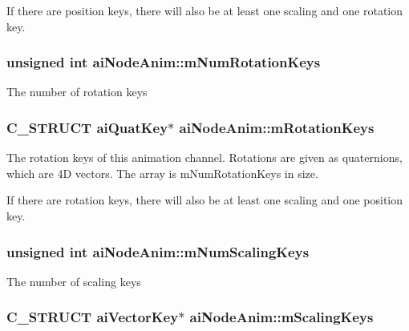 If there are position keys, there will also be at least one scaling and one rotation key. \hypertarget{structai_node_anim_ca7c78b89c4c64dcdf7619e105e0708c}{
\subsubsection[mNumRotationKeys]{\setlength{\rightskip}{0pt plus 5cm}unsigned int {\bf aiNodeAnim::mNumRotationKeys}}}
\label{structai_node_anim_ca7c78b89c4c64dcdf7619e105e0708c}


The number of rotation keys \hypertarget{structai_node_anim_be1b0b8b0b30a3950cf09023868a07ac}{
\subsubsection[mRotationKeys]{\setlength{\rightskip}{0pt plus 5cm}C\_\-STRUCT {\bf aiQuatKey}$\ast$ {\bf aiNodeAnim::mRotationKeys}}}
\label{structai_node_anim_be1b0b8b0b30a3950cf09023868a07ac}


The rotation keys of this animation channel. Rotations are given as quaternions, which are 4D vectors. The array is mNumRotationKeys in size.

If there are rotation keys, there will also be at least one scaling and one position key. \hypertarget{structai_node_anim_28fa0fd84571ac79cb45a537192738f6}{
\subsubsection[mNumScalingKeys]{\setlength{\rightskip}{0pt plus 5cm}unsigned int {\bf aiNodeAnim::mNumScalingKeys}}}
\label{structai_node_anim_28fa0fd84571ac79cb45a537192738f6}


The number of scaling keys \hypertarget{structai_node_anim_4588122722d5148d6e590da820bdf35f}{
\subsubsection[mScalingKeys]{\setlength{\rightskip}{0pt plus 5cm}C\_\-STRUCT {\bf aiVectorKey}$\ast$ {\bf aiNodeAnim::mScalingKeys}}}
\label{structai_node_anim_4588122722d5148d6e590da820bdf35f}


